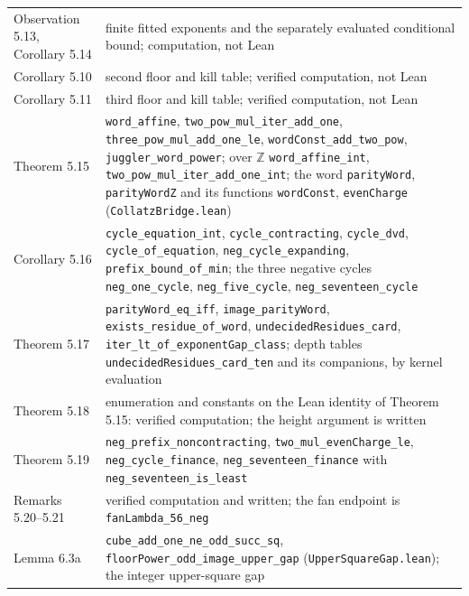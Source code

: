 \documentclass[12pt]{article}
\begin{document}
\begin{longtable}[]{@{}
  >{\raggedright\arraybackslash}p{}
  >{\raggedright\arraybackslash}p{}@{}}
Observation 5.13, Corollary 5.14 & finite fitted exponents and the
separately evaluated conditional bound; computation, not Lean \\
Corollary 5.10 & second floor and kill table; verified computation, not
Lean \\
Corollary 5.11 & third floor and kill table; verified computation, not
Lean \\
Theorem 5.15 & \texttt{\nolinkurl{word_affine}},
\texttt{\nolinkurl{two_pow_mul_iter_add_one}},
\texttt{\nolinkurl{three_pow_mul_add_one_le}},
\texttt{\nolinkurl{wordConst_add_two_pow}},
\texttt{\nolinkurl{juggler_word_power}}; over \(\mathbb Z\)
\texttt{\nolinkurl{word_affine_int}},
\texttt{\nolinkurl{two_pow_mul_iter_add_one_int}}; the word
\texttt{\nolinkurl{parityWord}}, \texttt{\nolinkurl{parityWordZ}} and
its functions \texttt{\nolinkurl{wordConst}},
\texttt{\nolinkurl{evenCharge}}
(\texttt{\nolinkurl{CollatzBridge.lean}}) \\
Corollary 5.16 & \texttt{\nolinkurl{cycle_equation_int}},
\texttt{\nolinkurl{cycle_contracting}}, \texttt{\nolinkurl{cycle_dvd}},
\texttt{\nolinkurl{cycle_of_equation}},
\texttt{\nolinkurl{neg_cycle_expanding}},
\texttt{\nolinkurl{prefix_bound_of_min}}; the three negative cycles
\texttt{\nolinkurl{neg_one_cycle}}, \texttt{\nolinkurl{neg_five_cycle}},
\texttt{\nolinkurl{neg_seventeen_cycle}} \\
Theorem 5.17 & \texttt{\nolinkurl{parityWord_eq_iff}},
\texttt{\nolinkurl{image_parityWord}},
\texttt{\nolinkurl{exists_residue_of_word}},
\texttt{\nolinkurl{undecidedResidues_card}},
\texttt{\nolinkurl{iter_lt_of_exponentGap_class}}; depth tables
\texttt{\nolinkurl{undecidedResidues_card_ten}} and its companions, by
kernel evaluation \\
Theorem 5.18 & enumeration and constants on the Lean identity of Theorem
5.15: verified computation; the height argument is written \\
Theorem 5.19 & \texttt{\nolinkurl{neg_prefix_noncontracting}},
\texttt{\nolinkurl{two_mul_evenCharge_le}},
\texttt{\nolinkurl{neg_cycle_finance}},
\texttt{\nolinkurl{neg_seventeen_finance}} with
\texttt{\nolinkurl{neg_seventeen_is_least}} \\
Remarks 5.20--5.21 & verified computation and written; the fan endpoint
is \texttt{\nolinkurl{fanLambda_56_neg}} \\
Lemma 6.3a & \texttt{\nolinkurl{cube_add_one_ne_odd_succ_sq}},
\texttt{\nolinkurl{floorPower_odd_image_upper_gap}}
(\texttt{\nolinkurl{UpperSquareGap.lean}}); the integer upper-square gap

\end{longtable}
\end{document}
